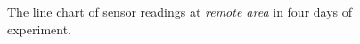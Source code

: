 \begin{figure}[H]
\begin{adjustwidth}{-5cm}{}
{{    }
  }
  \end{adjustwidth}
  \caption[The line chart of sensor readings at remote area.]
  {The line chart of sensor readings at \textit{remote area} in four days of experiment.}
  \label{fig:result-remote-line-chart}
\end{figure}


